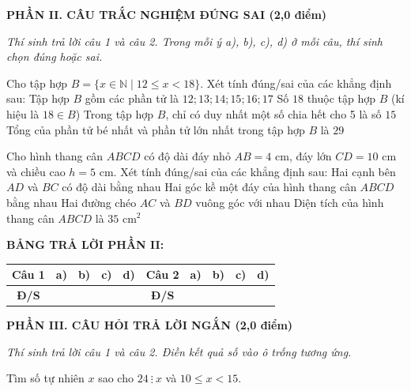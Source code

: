 \documentclass[12pt,a4paper]{article}
\begin{document}
\setcounter{ex}{0}
\noindent\textbf{\large PHẦN II. CÂU TRẮC NGHIỆM ĐÚNG SAI (2,0 điểm)}

\textit{Thí sinh trả lời câu 1 và câu 2. Trong mỗi ý a), b), c), d) ở mỗi câu, thí sinh chọn đúng hoặc sai.}

\vspace{1mm}
\begin{ex}
Cho tập hợp $B = \{x \in \mathbb{N} \mid 12 \le x < 18\}$. Xét tính đúng/sai của các khẳng định sau:
\choiceTF
{\True Tập hợp $B$ gồm các phần tử là $12; 13; 14; 15; 16; 17$}
{Số $18$ thuộc tập hợp $B$ (kí hiệu là $18 \in B$)}
{\True Trong tập hợp $B$, chỉ có duy nhất một số chia hết cho 5 là số $15$}
{\True Tổng của phần tử bé nhất và phần tử lớn nhất trong tập hợp $B$ là $29$}
\end{ex}

\begin{ex}
Cho hình thang cân $ABCD$ có độ dài đáy nhỏ $AB = 4\text{ cm}$, đáy lớn $CD = 10\text{ cm}$ và chiều cao $h = 5\text{ cm}$. Xét tính đúng/sai của các khẳng định sau:
\choiceTF
{\True Hai cạnh bên $AD$ và $BC$ có độ dài bằng nhau}
{\True Hai góc kề một đáy của hình thang cân $ABCD$ bằng nhau}
{Hai đường chéo $AC$ và $BD$ vuông góc với nhau}
{\True Diện tích của hình thang cân $ABCD$ là $35\text{ cm}^2$}
\end{ex}


\noindent\textbf{BẢNG TRẢ LỜI PHẦN II:}
\begin{center}
\begin{tabular}{|c|c|c|c|c||c|c|c|c|c|}
\hline
\textbf{Câu 1} & \textbf{a)} & \textbf{b)} & \textbf{c)} & \textbf{d)} & \textbf{Câu 2} & \textbf{a)} & \textbf{b)} & \textbf{c)} & \textbf{d)} \\
\hline
\textbf{Đ/S} & \rule{0pt}{0.6cm} & & & & \textbf{Đ/S} & & & & \\
\hline
\end{tabular}
\end{center}
\vspace{2mm}

\setcounter{ex}{0}
\noindent\textbf{\large PHẦN III. CÂU HỎI TRẢ LỜI NGẮN (2,0 điểm)}

\textit{Thí sinh trả lời câu 1 và câu 2. Điền kết quả số vào ô trống tương ứng.}

\vspace{1mm}
\begin{ex}
Tìm số tự nhiên $x$ sao cho $24 \ \vdots \ x$ và $10 \le x < 15$. 
\end{ex}
\end{document}
